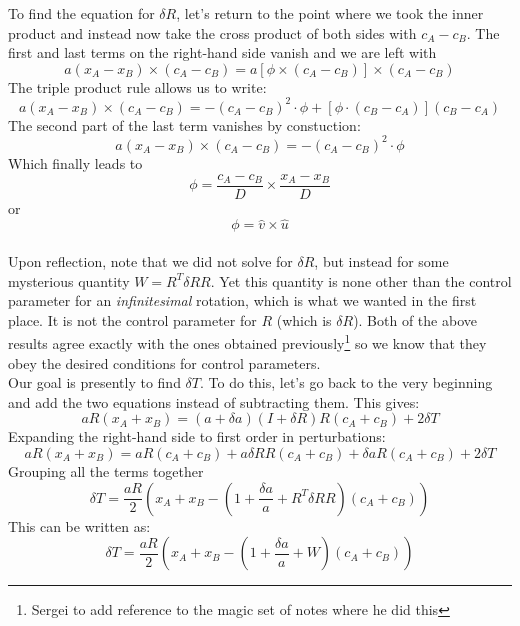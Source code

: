 \documentclass[aps, prd, amsmath, floats, floatfix, twocolumn,superscriptaddress, nofootinbib, showpacs]{revtex4-1}
\theoremstyle{plain}
\theoremstyle{definition}
\begin{document}
To find the equation for $ \delta R $, let's return to the point where we took the inner product and instead now take the cross product of both sides with $ c_{A} - c_{B} $. The first and last terms on the right-hand side vanish and we are left with 
\[ a(x_{A} - x_{B}) \times (c_{A} - c_{B}) = a[ \phi \times (c_{A} - c_{B})] \times (c_{A} - c_{B}) \]
The triple product rule allows us to write:
\[ a(x_{A} - x_{B}) \times (c_{A} - c_{B})  = -(c_{A} - c_{B})^{2} \cdot \phi + [ \phi \cdot (c_{B}-c_{A})](c_{B}-c_{A}) \]
The second part of the last term vanishes by constuction:
\[ a(x_{A} - x_{B}) \times (c_{A} - c_{B}) = -(c_{A} - c_{B})^{2} \cdot  \phi  \]
Which finally leads to
\begin{equation}
 \phi = \frac{c_{A}-c_{B}}{D} \times \frac{x_{A}-x_{B}}{D}
\end{equation}
or 
\[ \phi = \hat{v} \times \hat{u} \] \\
Upon reflection, note that we did not solve for $\delta R$, but instead for some mysterious quantity $W=R^{T}\delta R R$. Yet this quantity is none other than the control parameter for an \emph{infinitesimal} rotation, which is what we wanted in the first place. It is not the control parameter for $R$ (which is $\delta R$).
Both of the above results agree exactly with the ones obtained previously\footnote{Sergei to add reference to the magic set of notes where he did this} so we know that they obey the desired conditions for control parameters. \\

Our goal is presently to find $ \delta T $.  To do this, let's go back to the very beginning and add the two equations instead of subtracting them. This gives:
\[ aR(x_{A} + x_{B}) = (a+\delta a)  (I + \delta R)R(c_{A}+c_{B}) + 2 \delta T\]
Expanding the right-hand side to first order in perturbations:
\[ aR(x_{A} + x_{B}) = aR (c_{A}+c_{B}) + a\delta RR (c_{A}+c_{B}) + \delta a R (c_{A}+c_{B}) + 2 \delta T \]
Grouping all the terms together
\[ \delta T = \frac{aR}{2} \left( x_{A} + x_{B} - (1 + \frac{\delta a}{a} + R^{T}\delta RR)(c_{A} + c_{B})\right)\]
This can be written as:
\[ \delta T = \frac{aR}{2} \left( x_{A} + x_{B} - (1 + \frac{\delta a}{a} + W)(c_{A} + c_{B})\right)\]
\end{document}
